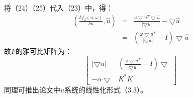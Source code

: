 \documentclass[a4paper,12pt]{article}
\begin{document}
将（24）（25）代入（23）中，得：	
\begin{eqnarray}
\left(
\frac{\delta f_2(u,\omega)}{\delta u},\hat{u} 
\right)
&=&\frac{\omega\bigtriangledown u^T \bigtriangledown \hat{u}}{|\bigtriangledown u|}-\bigtriangledown \hat{u}
\nonumber\\
&=&(\frac{\omega\bigtriangledown u^T}{|\bigtriangledown u|}-I)\bigtriangledown \hat{u}
\end{eqnarray}
故$F$的雅可比矩阵为：
\begin{equation}
\left[
\begin{array}{cc}
|\bigtriangledown u| & (\frac{\omega\bigtriangledown u^T}{|\bigtriangledown u|}-I)\bigtriangledown\\
-\alpha\bigtriangledown & K^*K
\end{array}
\right]
\end{equation}
同理可推出论文中$u$系统的线性化形式（3.3）。
\end{document}
